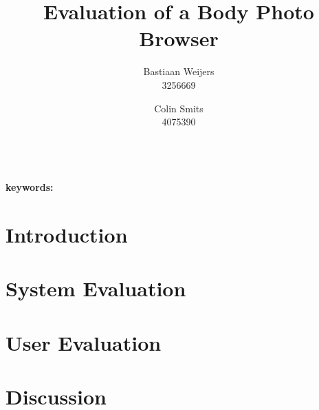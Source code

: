 \documentclass[11pt,a4paper]{article}
\author{Bastiaan Weijers \\ 3256669 \and Colin Smits \\ 4075390}
\title{Evaluation of a Body Photo Browser}
\begin{document}
\maketitle
{}\\
\textbf{keywords:}
 
\noindent\makebox[\linewidth]{\rule{\textwidth}{0.4pt}}
\section{Introduction}
\section{System Evaluation}
\section{User Evaluation}
\section{Discussion}

\end{document}
